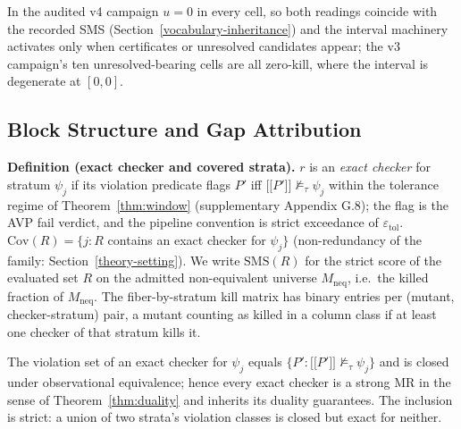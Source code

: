\documentclass[manuscript,screen,review]{acmart}
\begin{document}
In the audited v4 campaign $u = 0$ in every cell, so both readings
coincide with the recorded SMS
(Section~\ref{vocabulary-inheritance}) and the interval machinery
activates only when certificates or unresolved candidates appear; the
v3 campaign's ten unresolved-bearing cells are all zero-kill, where the
interval is degenerate at $[0, 0]$.

\subsection{Block Structure and Gap Attribution}\label{theory-gap}

\textbf{Definition (exact checker and covered strata).} $r$ is an
\emph{exact checker} for stratum $\psi_j$ if its violation predicate
flags $P'$ iff
$\mathopen{\lbrack\!\lbrack} P' \mathclose{\rbrack\!\rbrack} \not\models_{\tau} \psi_j$
within the tolerance regime of Theorem~\ref{thm:window} (supplementary
Appendix G.8); the flag is the AVP fail verdict, and the pipeline
convention is strict exceedance of $\varepsilon_{\mathrm{tol}}$.
$\mathrm{Cov}(R) = \{j : R$ contains an exact checker for $\psi_j\}$
(non-redundancy of the family: Section~\ref{theory-setting}). We write
$\mathrm{SMS}(R)$ for the strict score of the evaluated set $R$ on the
admitted non-equivalent universe $M_{\mathrm{neq}}$, i.e.\ the killed
fraction of $M_{\mathrm{neq}}$. The fiber-by-stratum kill matrix has
binary entries per (mutant, checker-stratum) pair, a mutant counting as
killed in a column class if at least one checker of that stratum kills
it.

\begin{lemma}\label{lem:closure}
The violation set of an exact checker for $\psi_j$ equals
$\{P' : \mathopen{\lbrack\!\lbrack} P' \mathclose{\rbrack\!\rbrack} \not\models_{\tau} \psi_j\}$
and is closed under observational equivalence; hence every exact checker
is a strong MR in the sense of Theorem~\ref{thm:duality} and inherits
its duality guarantees. The inclusion is strict: a union of two strata's
violation classes is closed but exact for neither.
\end{lemma}
\end{document}
